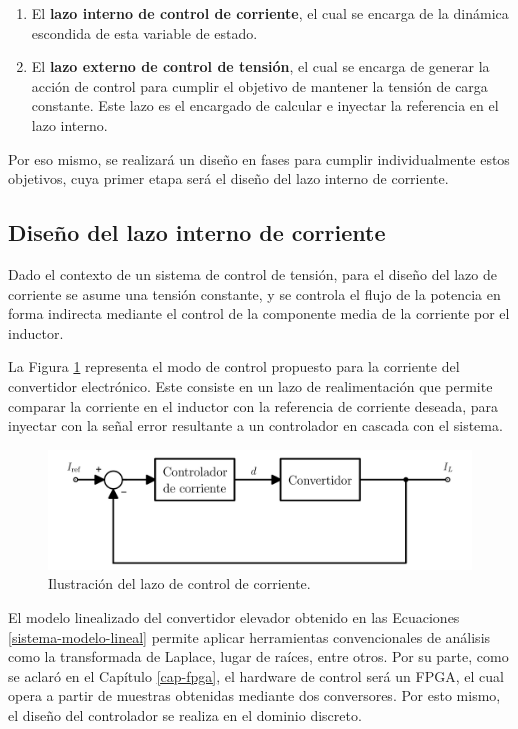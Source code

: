 \begin{enumerate}
  \item El \textbf{lazo interno de control de corriente}, el cual se encarga de la dinámica escondida de esta variable de estado.
  \item El \textbf{lazo externo de control de tensión}, el cual se encarga de generar la acción de control para cumplir el objetivo de mantener la tensión de carga constante. Este lazo es el encargado de calcular e inyectar la referencia en el lazo interno.
\end{enumerate}

Por eso mismo, se realizará un diseño en fases para cumplir individualmente estos objetivos, cuya primer etapa será el diseño del lazo interno de corriente.

\subsection{Diseño del lazo interno de corriente}

Dado el contexto de un sistema de control de tensión, para el diseño del lazo de corriente se asume una tensión constante, y se controla el flujo de la potencia en forma indirecta mediante el control de la componente media de la corriente por el inductor. 

La Figura \ref{lazo-corriente} representa el modo de control propuesto para la corriente del convertidor electrónico. Este consiste en un lazo de realimentación que permite comparar la corriente en el inductor con la referencia de corriente deseada, para inyectar con la señal error resultante a un controlador en cascada con el sistema.

\begin{figure}[hbt!]
  \centering
  \includegraphics[width=0.65\columnwidth]{Imágenes/Diseño del control/Lazo de control de corriente.pdf}
  \caption{Ilustración del lazo de control de corriente.}
  \label{lazo-corriente}
\end{figure} 

El modelo linealizado del convertidor elevador obtenido en las Ecuaciones \ref{sistema-modelo-lineal} permite aplicar herramientas convencionales de análisis como la transformada de Laplace, lugar de raíces, entre otros. Por su parte, como se aclaró en el Capítulo \ref{cap-fpga}, el hardware de control será un FPGA, el cual opera a partir de muestras obtenidas mediante dos conversores. Por esto mismo, el diseño del controlador se realiza en el dominio discreto.

